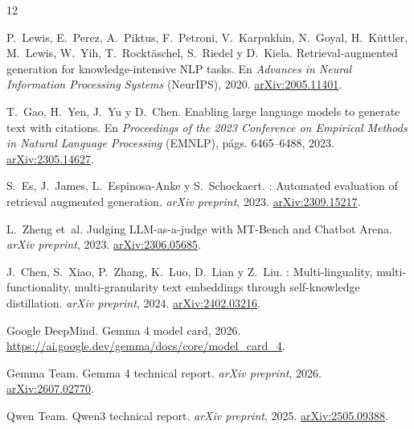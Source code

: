\documentclass{article}
\begin{document}

\begin{thebibliography}{12}

P.~Lewis, E.~Perez, A.~Piktus, F.~Petroni, V.~Karpukhin, N.~Goyal,
H.~Küttler, M.~Lewis, W.~Yih, T.~Rocktäschel, S.~Riedel y D.~Kiela.
\newblock Retrieval-augmented generation for knowledge-intensive {NLP} tasks.
\newblock En \emph{Advances in Neural Information Processing Systems}
(NeurIPS), 2020.
\newblock \href{https://arxiv.org/abs/2005.11401}{arXiv:2005.11401}.

T.~Gao, H.~Yen, J.~Yu y D.~Chen.
\newblock Enabling large language models to generate text with citations.
\newblock En \emph{Proceedings of the 2023 Conference on Empirical Methods in
Natural Language Processing} (EMNLP), págs. 6465--6488, 2023.
\newblock \href{https://arxiv.org/abs/2305.14627}{arXiv:2305.14627}.

S.~Es, J.~James, L.~Espinosa-Anke y S.~Schockaert.
: Automated evaluation of retrieval augmented generation.
\newblock \emph{arXiv preprint}, 2023.
\newblock \href{https://arxiv.org/abs/2309.15217}{arXiv:2309.15217}.

L.~Zheng et~al.
\newblock Judging {LLM}-as-a-judge with {MT-Bench} and {Chatbot Arena}.
\newblock \emph{arXiv preprint}, 2023.
\newblock \href{https://arxiv.org/abs/2306.05685}{arXiv:2306.05685}.

J.~Chen, S.~Xiao, P.~Zhang, K.~Luo, D.~Lian y Z.~Liu.
: Multi-linguality, multi-functionality,
multi-granularity text embeddings through self-knowledge distillation.
\newblock \emph{arXiv preprint}, 2024.
\newblock \href{https://arxiv.org/abs/2402.03216}{arXiv:2402.03216}.

Google DeepMind.
\newblock Gemma 4 model card, 2026.
\newblock \url{https://ai.google.dev/gemma/docs/core/model_card_4}.

Gemma Team.
\newblock Gemma 4 technical report.
\newblock \emph{arXiv preprint}, 2026.
\newblock \href{https://arxiv.org/abs/2607.02770}{arXiv:2607.02770}.

Qwen Team.
\newblock Qwen3 technical report.
\newblock \emph{arXiv preprint}, 2025.
\newblock \href{https://arxiv.org/abs/2505.09388}{arXiv:2505.09388}.


\end{thebibliography}
\end{document}

